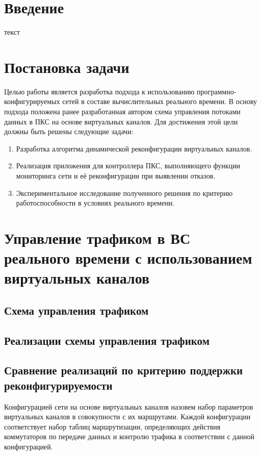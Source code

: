 \documentclass[12pt,fleqn]{article}
\begin{document}
\section*{Введение}
текст

\section{Постановка задачи}
Целью работы является разработка подхода к использованию программно-конфигурируемых сетей в составе вычислительных реального времени. В основу подхода положена ранее разработанная автором схема управления потоками данных в ПКС на основе виртуальных каналов. Для достижения этой цели должны быть решены следующие задачи:
\begin{enumerate}
	\item Разработка алгоритма динамической реконфигурации виртуальных каналов.
	\item Реализация приложения для контроллера ПКС, выполняющего функции мониторинга сети и её реконфигурации при выявлении отказов.
	\item Экспериментальное исследование полученного решения по критерию работоспособности в условиях реального времени.
\end{enumerate}

\section{Управление трафиком в ВС реального времени с использованием виртуальных каналов} \label{sec:scheme}
\subsection{Схема управления трафиком}
\subsection{Реализации схемы управления трафиком}
\subsection{Сравнение реализаций по критерию поддержки реконфигурируемости}
Конфигурацией сети на основе виртуальных каналов назовем набор параметров виртуальных каналов в совокупности с их маршрутами. Каждой конфигурации соответствует набор таблиц маршрутизации, определяющих действия коммутаторов по передаче данных и контролю трафика в соответствии с данной конфигурацией.
\end{document}
